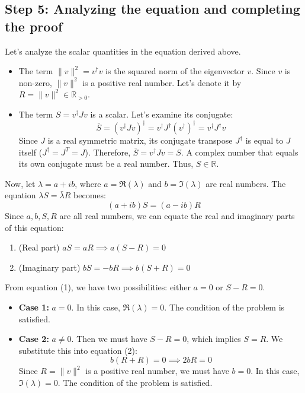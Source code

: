 \documentclass[12pt,a4paper]{article}
\theoremstyle{definition}
\begin{document}
    \subsection*{Step 5: Analyzing the equation and completing the proof}
    Let's analyze the scalar quantities in the equation derived above.
    \begin{itemize}
        \item The term $\|v\|^2 = v^\dagger v$ is the squared norm of the eigenvector $v$. Since $v$ is non-zero, $\|v\|^2$ is a positive real number. Let's denote it by $R = \|v\|^2 \in \mathbb{R}_{>0}$.
        \item The term $S = v^\dagger J v$ is a scalar. Let's examine its conjugate:
        $$\bar{S} = (v^\dagger J v)^\dagger = v^\dagger J^\dagger (v^\dagger)^\dagger = v^\dagger J^\dagger v$$
        Since $J$ is a real symmetric matrix, its conjugate transpose $J^\dagger$ is equal to $J$ itself ($J^\dagger = J^T = J$). Therefore, $\bar{S} = v^\dagger J v = S$. A complex number that equals its own conjugate must be a real number. Thus, $S \in \mathbb{R}$.
    \end{itemize}

    Now, let $\lambda = a + ib$, where $a = \Re(\lambda)$ and $b = \Im(\lambda)$ are real numbers. The equation $\lambda S = \bar{\lambda} R$ becomes:
    $$(a+ib)S = (a-ib)R$$
    Since $a, b, S, R$ are all real numbers, we can equate the real and imaginary parts of this equation:
    \begin{enumerate}
        \item (Real part) $aS = aR \implies a(S-R) = 0$
        \item (Imaginary part) $bS = -bR \implies b(S+R) = 0$
    \end{enumerate}

    From equation (1), we have two possibilities: either $a=0$ or $S-R=0$.
    \begin{itemize}
        \item \textbf{Case 1:} $a=0$. In this case, $\Re(\lambda)=0$. The condition of the problem is satisfied.
        \item \textbf{Case 2:} $a \neq 0$. Then we must have $S-R=0$, which implies $S=R$. We substitute this into equation (2):
        $$b(R+R) = 0 \implies 2bR = 0$$
        Since $R = \|v\|^2$ is a positive real number, we must have $b=0$. In this case, $\Im(\lambda)=0$. The condition of the problem is satisfied.
    \end{itemize}
\end{document}
